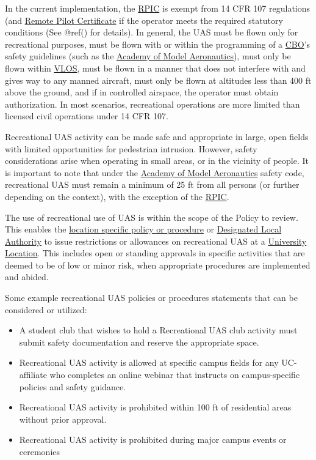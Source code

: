\documentclass[
]{book}
\providecommand{\tightlist}{%
  \setlength{\itemsep}{0pt}\setlength{\parskip}{0pt}}
\begin{document}
In the current implementation, the \protect\hyperlink{RPIC}{RPIC} is exempt from 14 CFR 107 regulations (and \protect\hyperlink{RPC}{Remote Pilot Certificate} if the operator meets the required statutory conditions (See @ref() for details). In general, the UAS must be flown only for recreational purposes, must be flown with or within the programming of a \protect\hyperlink{CBO}{CBO}'s safety guidelines (such as the \protect\hyperlink{AMA}{Academy of Model Aeronautics}), must only be flown within \protect\hyperlink{VLOS}{VLOS}, must be flown in a manner that does not interfere with and gives way to any manned aircraft, must only be flown at altitudes less than 400 ft above the ground, and if in controlled airspace, the operator must obtain authorization. In most scenarios, recreational operations are more limited than licensed civil operations under 14 CFR 107.

Recreational UAS activity can be made safe and appropriate in large, open fields with limited opportunities for pedestrian intrusion. However, safety considerations arise when operating in small areas, or in the vicinity of people. It is important to note that under the \protect\hyperlink{AMA}{Academy of Model Aeronautics} safety code, recreational UAS must remain a minimum of 25 ft from all persons (or further depending on the context), with the exception of the \protect\hyperlink{RPIC}{RPIC}.

The use of recreational use of UAS is within the scope of the Policy to review. This enables the \protect\hyperlink{LSP}{location specific policy or procedure} or \protect\hyperlink{DLA}{Designated Local Authority} to issue restrictions or allowances on recreational UAS at a \protect\hyperlink{UL}{University Location}. This includes open or standing approvals in specific activities that are deemed to be of low or minor risk, when appropriate procedures are implemented and abided.

Some example recreational UAS policies or procedures statements that can be considered or utilized:

\begin{itemize}
\tightlist
\item
  A student club that wishes to hold a Recreational UAS club activity must submit safety documentation and reserve the appropriate space.
\item
  Recreational UAS activity is allowed at specific campus fields for any UC-affiliate who completes an online webinar that instructs on campus-specific policies and safety guidance.
\item
  Recreational UAS activity is prohibited within 100 ft of residential areas without prior approval.
\item
  Recreational UAS activity is prohibited during major campus events or ceremonies
\end{itemize}
\end{document}
